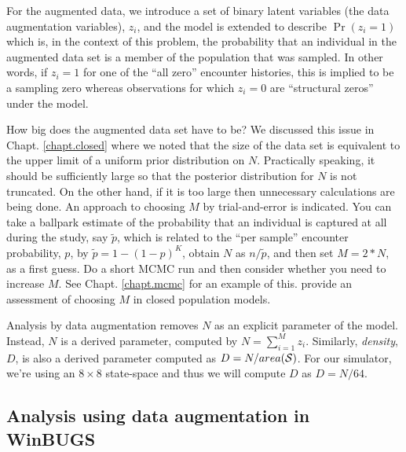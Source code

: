For the augmented data, we introduce a set of binary latent variables
(the data augmentation variables), $z_{i}$, and the model is extended
to describe $\Pr(z_{i} = 1)$ which is, in the context of this problem,
the probability that an individual in the augmented data set is a
member of the population that was sampled. In other words, if $z_{i}=1$
for one of the ``all zero'' encounter histories, this is implied to be
a sampling zero whereas observations for which $z_{i}=0$ are
``structural zeros'' under the model.

How big does the augmented data set have to be? We discussed this
issue in Chapt. \ref{chapt.closed} where we noted that the size of the data set is
equivalent to the upper limit of a uniform prior distribution on $N$.
Practically speaking, it should be sufficiently large so that the
posterior distribution for $N$ is not truncated. On the other hand, if
it is too large then unnecessary calculations are being done. An
approach to choosing $M$ by trial-and-error is indicated. You can take
a ballpark estimate of the probability that an individual is captured
at all during the study, say $\tilde{p}$, which is related to the
``per sample'' encounter probability, $p$, by $\tilde{p} = 1-(1-p)^{K}$, obtain $N$ as $n/\tilde{p}$, and then set $M =
2*N$, as a first guess. Do a short MCMC run and then consider whether
you need to increase $M$. See Chapt. \ref{chapt.mcmc} for an
example of this. \citet[][ch. 6]{kery_schaub:2011}
 provide an assessment of choosing $M$ in closed population models.

Analysis by data augmentation removes $N$ as an explicit parameter of
the model. Instead, $N$ is a derived parameter, computed by $N=
\sum_{i=1}^{M} z_{i}$. Similarly, {\it density}, $D$, is also a
derived parameter computed as $D=N/area({\cal S})$. For our
simulator, we're using an $8 \times 8$ state-space and thus we will
compute $D$ as $D=N/64$.

\subsection{Analysis using data augmentation in WinBUGS}

